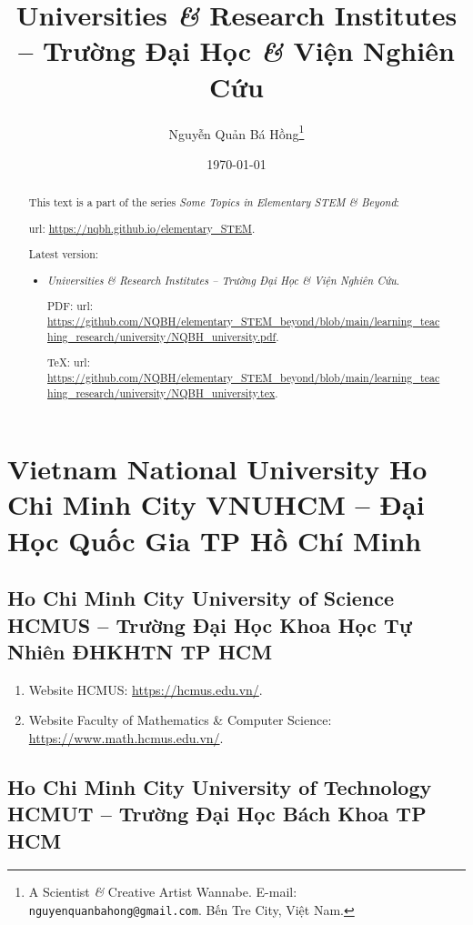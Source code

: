 \documentclass{article}
\title{Universities {\it\&} Research Institutes -- Trường Đại Học {\it\&} Viện Nghiên Cứu}
\author{Nguyễn Quản Bá Hồng\footnote{A Scientist {\it\&} Creative Artist Wannabe. E-mail: {\tt nguyenquanbahong@gmail.com}. Bến Tre City, Việt Nam.}}
\date{\today}
\begin{document}
\maketitle
\begin{abstract}
	This text is a part of the series {\it Some Topics in Elementary STEM \& Beyond}:
	
	{\sc url}: \url{https://nqbh.github.io/elementary_STEM}.
	
	Latest version:
	\begin{itemize}
		\item {\it Universities \& Research Institutes -- Trường Đại Học \& Viện Nghiên Cứu}.
		
		PDF: {\sc url}: \url{https://github.com/NQBH/elementary_STEM_beyond/blob/main/learning_teaching_research/university/NQBH_university.pdf}.
		
		\TeX: {\sc url}: \url{https://github.com/NQBH/elementary_STEM_beyond/blob/main/learning_teaching_research/university/NQBH_university.tex}.
	\end{itemize}
\end{abstract}
\tableofcontents


\section{Vietnam National University Ho Chi Minh City VNUHCM -- Đại Học Quốc Gia TP Hồ Chí Minh}

\subsection{Ho Chi Minh City University of Science HCMUS -- Trường Đại Học Khoa Học Tự Nhiên ĐHKHTN TP HCM}
\begin{enumerate}
	\item Website HCMUS: \url{https://hcmus.edu.vn/}.
	\item Website Faculty of Mathematics \& Computer Science: \url{https://www.math.hcmus.edu.vn/}.
\end{enumerate}


\subsection{Ho Chi Minh City University of Technology HCMUT -- Trường Đại Học Bách Khoa TP HCM}
\end{document}

